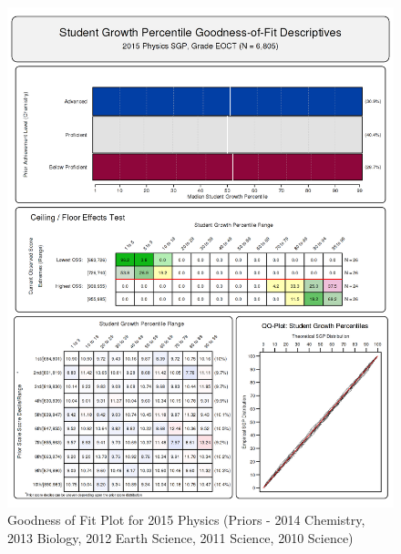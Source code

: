 \documentclass[12pt]{article}
\begin{document}
\begin{figure}[htbp]
\centering
\includegraphics{../img/Goodness_of_Fit/PHYSICS.2015/2015_PHYSICS_EOCT;2014_CHEMISTRY_EOCT;2013_BIOLOGY_EOCT;2012_EARTH_SCIENCE_EOCT;2011_SCIENCE_EOCT;2010_SCIENCE_EOCT.png}
\caption{Goodness of Fit Plot for 2015 Physics (Priors - 2014 Chemistry,
2013 Biology, 2012 Earth Science, 2011 Science, 2010 Science)}
\end{figure}
\end{document}
